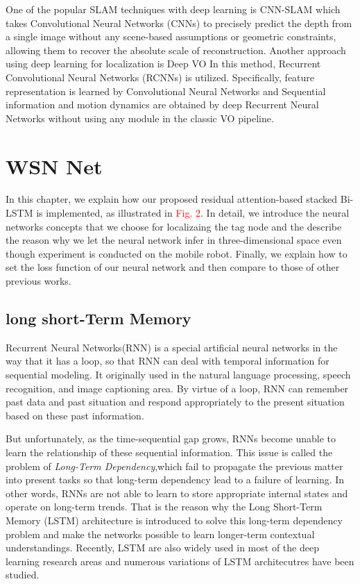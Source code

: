 \documentclass{ieeeaccess}
\begin{document}
One of the popular SLAM techniques with deep learning is CNN-SLAM \cite{tateno2017cnn} which takes Convolutional Neural Networks (CNNs) to precisely predict the depth from a single image without any scene-based assumptions or geometric constraints, allowing them to recover the absolute scale of reconstruction. Another approach using deep learning for localization is Deep VO \cite{clark2017vinet} In this method, Recurrent Convolutional Neural Networks (RCNNs) is utilized. Specifically, feature representation is learned by Convolutional Neural Networks and Sequential information and motion dynamics are obtained by deep Recurrent Neural Networks without using any module in the classic VO pipeline.

\section{WSN Net}

In this chapter, we explain how our proposed residual attention-based stacked Bi-LSTM is implemented, as illustrated in \textcolor{red}{Fig. 2}. 
In detail, we introduce the neural networks concepts that we choose for localizaing the tag node and the describe the reason why we let the neural network infer in three-dimensional space even though experiment is conducted on the mobile robot. Finally, we explain how to set the loss function of our neural network and then compare to those of other previous works.

\subsection{long short-Term Memory}

Recurrent Neural Networks(RNN) is a special artificial neural networks in the way that it has a loop, so that RNN can deal with temporal information for sequential modeling. It originally used in the natural language processing, speech recognition, and image captioning area. By virtue of a loop, RNN can remember past data and past situation and respond appropriately to the present situation based on these past information. 

But unfortunately, as the time-sequential gap grows, RNNs become unable to learn the relationship of these sequential information. This issue is called the problem of \textit{Long-Term Dependency},which fail to propagate the previous matter into present tasks so that long-term dependency lead to a failure of learning. In other words, RNNs are not able to learn to store appropriate internal states and operate on long-term trends. That is the reason why the Long Short-Term Memory (LSTM) architecture is introduced to solve this long-term dependency problem and make the networks possible to learn longer-term contextual
understandings. Recently, LSTM are also widely used in most of the deep learning research areas and numerous variations of LSTM architecutres have been studied.
\end{document}
